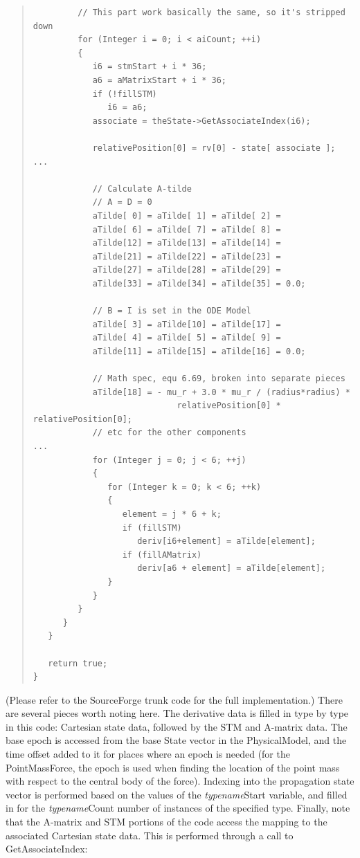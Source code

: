 \documentclass[letterpaper,10pt]{article}
\begin{document}
\begin{quote}
\begin{verbatim}
         // This part work basically the same, so it's stripped down
         for (Integer i = 0; i < aiCount; ++i)
         {
            i6 = stmStart + i * 36;
            a6 = aMatrixStart + i * 36;
            if (!fillSTM)
               i6 = a6;
            associate = theState->GetAssociateIndex(i6);
            
            relativePosition[0] = rv[0] - state[ associate ];
...                

            // Calculate A-tilde
            // A = D = 0
            aTilde[ 0] = aTilde[ 1] = aTilde[ 2] = 
            aTilde[ 6] = aTilde[ 7] = aTilde[ 8] =
            aTilde[12] = aTilde[13] = aTilde[14] =
            aTilde[21] = aTilde[22] = aTilde[23] = 
            aTilde[27] = aTilde[28] = aTilde[29] =
            aTilde[33] = aTilde[34] = aTilde[35] = 0.0;
            
            // B = I is set in the ODE Model
            aTilde[ 3] = aTilde[10] = aTilde[17] =
            aTilde[ 4] = aTilde[ 5] = aTilde[ 9] =
            aTilde[11] = aTilde[15] = aTilde[16] = 0.0;
               
            // Math spec, equ 6.69, broken into separate pieces
            aTilde[18] = - mu_r + 3.0 * mu_r / (radius*radius) * 
                             relativePosition[0] * relativePosition[0];
            // etc for the other components
...
            for (Integer j = 0; j < 6; ++j)
            {
               for (Integer k = 0; k < 6; ++k)
               {
                  element = j * 6 + k;
                  if (fillSTM)
                     deriv[i6+element] = aTilde[element];
                  if (fillAMatrix)
                     deriv[a6 + element] = aTilde[element];
               }
            }
         }
      }
   }
 
   return true;
}
\end{verbatim}
\end{quote}

\noindent (Please refer to the SourceForge trunk code for the full
implementation.)  There are several pieces worth noting here.  The derivative
data is filled in type by type in this code: Cartesian state data, followed by
the STM and A-matrix data.  The base epoch is accessed from the base State
vector in the PhysicalModel, and the time offset added to it for places where
an epoch is needed (for the PointMassForce, the epoch is used when finding the
location of the point mass with respect to the central body of the force). 
Indexing into the propagation state vector is performed based on the values of
the \textit{typename}Start variable, and filled in for the
\textit{typename}Count number of instances of the specified type.  Finally,
note that the A-matrix and STM portions of the code access the mapping to the
associated Cartesian state data.  This is performed through a call to
GetAssociateIndex:
\end{document}

